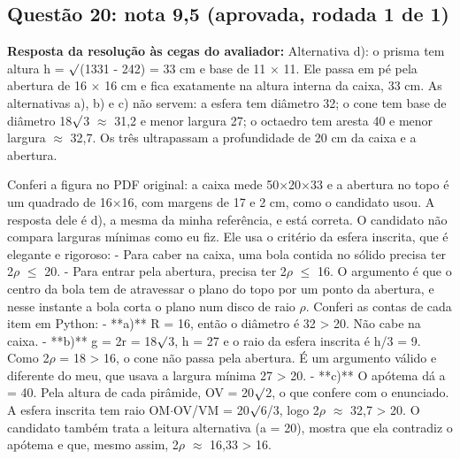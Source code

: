 \documentclass{article}%
\begin{document}
\subsection*{Questão 20: nota 9,5 (aprovada, rodada 1 de 1)}%
\textbf{Resposta da resolução às cegas do avaliador:} Alternativa d): o prisma tem altura h = $\surd$(1331 - 242) = 33 cm e base de 11 $\times$ 11. Ele passa em pé pela abertura de 16 $\times$ 16 cm e fica exatamente na altura interna da caixa, 33 cm. As alternativas a), b) e c) não servem: a esfera tem diâmetro 32; o cone tem base de diâmetro 18$\surd$3 $\approx$ 31,2 e menor largura 27; o octaedro tem aresta 40 e menor largura $\approx$ 32,7. Os três ultrapassam a profundidade de 20 cm da caixa e a abertura.\par %
Conferi a figura no PDF original: a caixa mede 50$\times$20$\times$33 e a abertura no topo é um quadrado de 16$\times$16, com margens de 17 e 2 cm, como o candidato usou. A resposta dele é d), a mesma da minha referência, e está correta.\newline%
\newline%
O candidato não compara larguras mínimas como eu fiz. Ele usa o critério da esfera inscrita, que é elegante e rigoroso:\newline%
{-} Para caber na caixa, uma bola contida no sólido precisa ter 2$\rho$ $\leq$ 20.\newline%
{-} Para entrar pela abertura, precisa ter 2$\rho$ $\leq$ 16. O argumento é que o centro da bola tem de atravessar o plano do topo por um ponto da abertura, e nesse instante a bola corta o plano num disco de raio $\rho$.\newline%
\newline%
Conferi as contas de cada item em Python:\newline%
{-} **a)** R = 16, então o diâmetro é 32 > 20. Não cabe na caixa.\newline%
{-} **b)** g = 2r = 18$\surd$3, h = 27 e o raio da esfera inscrita é h/3 = 9. Como 2$\rho$ = 18 > 16, o cone não passa pela abertura. É um argumento válido e diferente do meu, que usava a largura mínima 27 > 20.\newline%
{-} **c)** O apótema dá a = 40. Pela altura de cada pirâmide, OV = 20$\surd$2, o que confere com o enunciado. A esfera inscrita tem raio OM$\cdot$OV/VM = 20$\surd$6/3, logo 2$\rho$ $\approx$ 32,7 > 20. O candidato também trata a leitura alternativa (a = 20), mostra que ela contradiz o apótema e que, mesmo assim, 2$\rho$ $\approx$ 16,33 > 16.\newline%
\end{document}
